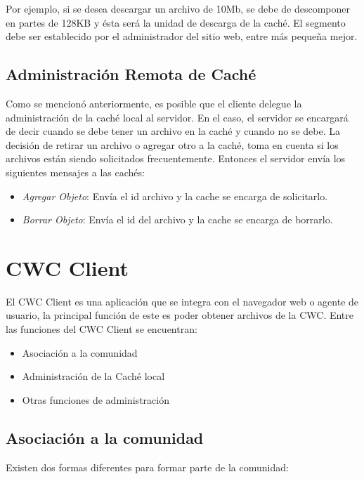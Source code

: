 Por ejemplo, si se desea descargar un archivo de 10Mb, se debe de descomponer en partes de 128KB y ésta será la unidad de descarga de la caché. El segmento debe ser establecido por el administrador del sitio web, entre más pequeña mejor.

\subsection{Administración Remota de Caché}

Como se mencionó anteriormente, es posible que el cliente delegue la administración de la caché local al servidor. En el caso, el servidor se encargará de decir cuando se debe tener un archivo en la caché y cuando no se debe. La decisión de retirar un archivo o agregar otro a la caché, toma en cuenta si los archivos están siendo solicitados frecuentemente. Entonces el servidor envía los siguientes mensajes a las cachés:

\begin{itemize}
\item \textit{Agregar Objeto}: Envía el id archivo y la cache se encarga de solicitarlo.
\item \textit{Borrar Objeto}: Envía el id del archivo y la cache se encarga de borrarlo.
\end{itemize}

\section{CWC Client}
El CWC Client es una aplicación que se integra con el navegador web o agente de usuario, la principal función de este es poder obtener archivos de la CWC.  Entre las funciones del CWC Client se encuentran:

\begin{itemize}
\item Asociación a la comunidad
\item Administración de la Caché local
\item Otras funciones de administración
\end{itemize}

\subsection{Asociación a la comunidad}

Existen dos formas diferentes para formar parte de la comunidad:

